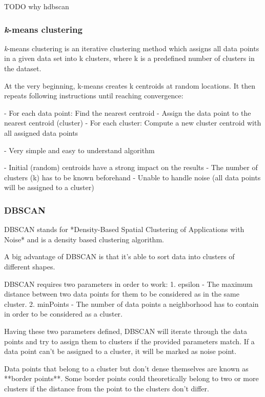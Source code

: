 TODO why hdbscan

\subsubsection{\textit{k}-means clustering}
\textit{k}-means clustering is an iterative clustering method which assigns all data points in a given data set
into k clusters, where k is a predefined number of clusters in the dataset.

At the very beginning, k-means creates k centroids at random locations.
It then repeats following instructions until reaching convergence:

- For each data point: Find the nearest centroid
- Assign the data point to the nearest centroid (cluster)
- For each cluster: Compute a new cluster centroid with all assigned data points

- Very simple and easy to understand algorithm

- Initial (random) centroids have a strong impact on the results
- The number of clusters (k) has to be known beforehand
- Unable to handle noise (all data points will be assigned to a cluster)

\subsubsection{DBSCAN}
DBSCAN stands for *Density-Based Spatial Clustering of Applications with Noise*
and is a density based clustering algorithm.

A big advantage of DBSCAN is that it's able to sort data into clusters
of different shapes.

DBSCAN requires two parameters in order to work:
1. epsilon - The maximum distance between two data points for them to be considered as in the same cluster.
2. minPoints - The number of data points a neighborhood has to contain in order to be considered as a cluster.

Having these two parameters defined, DBSCAN will iterate through the data points
and try to assign them to clusters if the provided parameters match.
If a data point can't be assigned to a cluster, it will be marked as noise point.

Data points that belong to a cluster but don't dense themselves are known
as **border points**. Some border points could theoretically belong to two or more clusters
if the distance from the point to the clusters don't differ.

